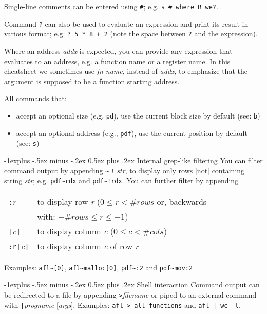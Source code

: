 \documentclass[a4paper,landscape]{article}
\makeatletter
\renewcommand{\subsection}{\@startsection{subsection}{2}{0mm}%
                                {-1explus -.5ex minus -.2ex}%
                                {0.5ex plus .2ex}%
                                {\normalfont\normalsize\bfseries}}
\makeatother
\begin{document}
\begin{multicols*}{3}
Single-line comments can be entered using \texttt{\#}; e.g. \texttt{s \# where R we?}.

Command \texttt{?} can also be used to evaluate an expression and print its result in various format; e.g. \texttt{? 5 * 8 + 2} (note the space between \texttt{?} and the expression).

Where an address \textit{addx} is expected, you can provide any expression that evaluates to an address,
e.g. a function name or a register name. In this cheatsheet we sometimes use \textit{fn-name}, instead of \textit{addx}, to emphasize that the argument is supposed to be a function starting address.

All commands that:
\begin{itemize}
\item accept an optional size (e.g. \texttt{pd}), use the current block size by default (see: \texttt{b})
\item accept an optional address (e.g., \texttt{pdf}), use the current position by default (see: \texttt{s})
\end{itemize}

\subsection{Internal grep-like filtering}
You can filter command output by appending \texttt{\textasciitilde{}}[\texttt{!}]\textit{str}, to display only rows [not] containing string \textit{str}; e.g. \texttt{pdf\textasciitilde{}rdx} and \texttt{pdf\textasciitilde{}!rdx}. You can further filter by appending

\begin{tabular}{@{}ll@{}}
\texttt{:}\textit{r}	& to display row \textit{r} ($0\le r < \#\mathit{rows}$ or, backwards \\ & with: $-\#\mathit{rows}\le r \le -1)$ \\
\texttt{[}\textit{c}\texttt{]}	& to display column \textit{c} ($0\le c < \#\mathit{cols}$) \\
\texttt{:r[}\textit{c}\texttt{]}	& to display column \textit{c} of row $r$
\end{tabular}

Examples: \texttt{afl\textasciitilde{}[0]}, \texttt{afl\textasciitilde{}malloc[0]}, \texttt{pdf\textasciitilde{}:2} and \texttt{pdf\textasciitilde{}mov:2}

\subsection{Shell interaction}
Command output can be redirected to a file by appending \texttt{>}\textit{filename}
or piped to an external command with \texttt{|}\textit{progname} [\textit{args}].
Examples: \texttt{afl > all\_functions} and \texttt{afl | wc -l}.


\end{multicols*}
\end{document}
